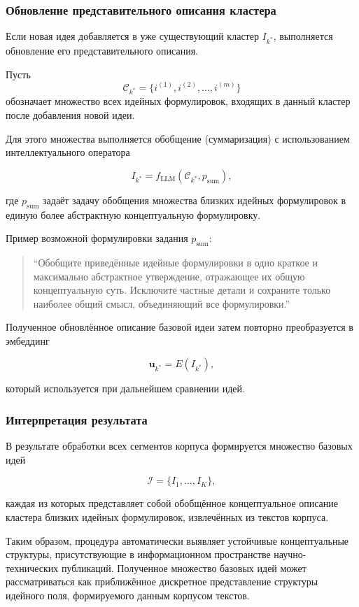 \documentclass[review,3p,times]{elsarticle}
\begin{document}
\subsubsection{Обновление представительного описания кластера}

Если новая идея добавляется в уже существующий кластер $I_{k^*}$, выполняется обновление его представительного описания.

Пусть
\[
\mathcal{C}_{k^*} = \{i^{(1)}, i^{(2)}, \dots, i^{(m)}\}
\]
обозначает множество всех идейных формулировок, входящих в данный кластер после добавления новой идеи.

Для этого множества выполняется обобщение (суммаризация) с использованием интеллектуального оператора

\[
I_{k^*} = f_{\mathrm{LLM}}(\mathcal{C}_{k^*}, p_{\mathrm{sum}}),
\]

где $p_{\mathrm{sum}}$ задаёт задачу обобщения множества близких идейных формулировок в единую более абстрактную концептуальную формулировку.

Пример возможной формулировки задания $p_{\mathrm{sum}}$:

\begin{quote}
``Обобщите приведённые идейные формулировки в одно краткое и максимально абстрактное утверждение, отражающее их общую концептуальную суть. Исключите частные детали и сохраните только наиболее общий смысл, объединяющий все формулировки.''
\end{quote}


Полученное обновлённое описание базовой идеи затем повторно преобразуется в эмбеддинг

\[
\mathbf{u}_{k^*} = E(I_{k^*}),
\]

который используется при дальнейшем сравнении идей.

\subsubsection{Интерпретация результата}

В результате обработки всех сегментов корпуса формируется множество базовых идей

\[
\mathcal{I}=\{I_1,\dots,I_K\},
\]

каждая из которых представляет собой обобщённое концептуальное описание кластера близких идейных формулировок, извлечённых из текстов корпуса.

Таким образом, процедура автоматически выявляет устойчивые концептуальные структуры, присутствующие в информационном пространстве научно-технических публикаций. Полученное множество базовых идей может рассматриваться как приближённое дискретное представление структуры идейного поля, формируемого данным корпусом текстов.
\end{document}
